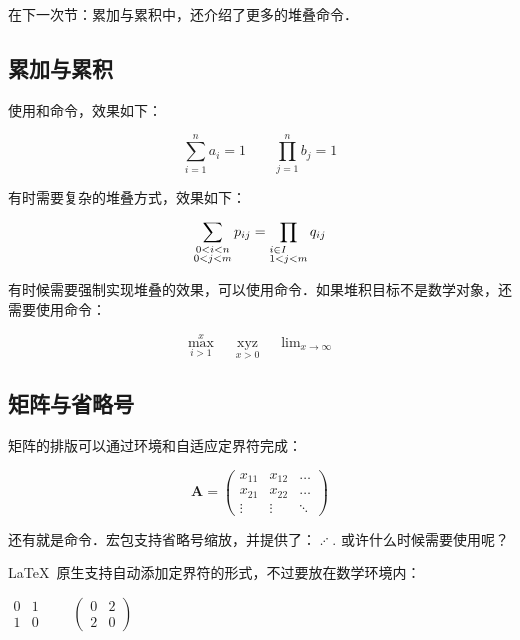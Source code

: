 在下一次节：累加与累积中，还介绍了更多的堆叠命令．

\subsection{累加与累积}
使用和命令，效果如下：

\begin{codeshow}
\[\sum_{i=1}^{n}a_i=1 \qquad
\prod_{j=1}^{n}b_j=1\]
\end{codeshow}

有时需要复杂的堆叠方式，效果如下：

\begin{codeshow}
\[\sum_{\substack{0<i<n \\
  0<j<m}} p_{ij}=
  \prod_{\begin{subarray}{l}
  i\in I \\  1<j<m
  \end{subarray}}q_{ij}\]
\end{codeshow}

有时候需要强制实现堆叠的效果，可以使用命令．如果堆积目标不是数学对象，还需要使用命令：

\begin{codeshow}
\[\max\limits_{i>1}^{x}\quad
\mathop{xyz}\limits_{x>0}\quad
\lim\nolimits_{x\to \infty}\]
\end{codeshow}

\subsection{矩阵与省略号}
矩阵的排版可以通过环境和自适应定界符完成：

\begin{codeshow}
\[\mathbf{A}=
\left(\begin{array}{ccc}
x_{11} & x_{12} & \ldots \\
x_{21} & x_{22} & \ldots \\
\vdots & \vdots & \ddots
\end{array}\right)\]
\end{codeshow}

还有就是命令．宏包支持省略号缩放，并提供了：$\iddots$. 或许什么时候需要使用呢？

\LaTeX\ 原生支持自动添加定界符的形式，不过要放在数学环境内：
\begin{codeshow}
\centering $\begin{matrix}
0 & 1 \\ 1 & 0 \end{matrix}\qquad
\begin{pmatrix} 0 & 2 \\
2 & 0 \end{pmatrix}$
\end{codeshow}

